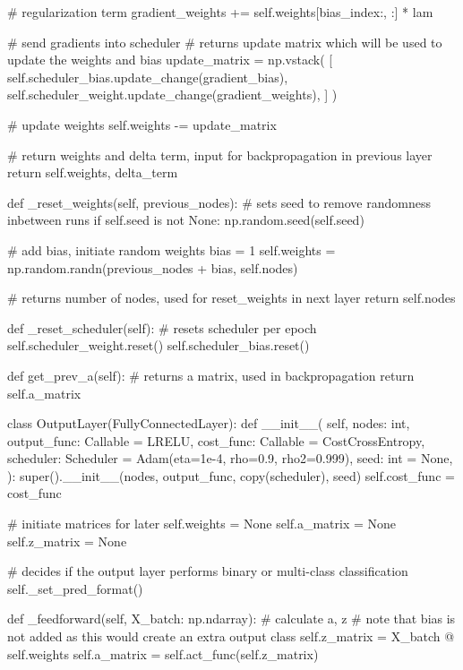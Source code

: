 \documentclass[%
oneside,                 %
final,                   %
10pt]{article}
\begin{document}
        # regularization term
        gradient_weights += self.weights[bias_index:, :] * lam

        # send gradients into scheduler
        # returns update matrix which will be used to update the weights and bias
        update_matrix = np.vstack(
            [
                self.scheduler_bias.update_change(gradient_bias),
                self.scheduler_weight.update_change(gradient_weights),
            ]
        )

        # update weights
        self.weights -= update_matrix

        # return weights and delta term, input for backpropagation in previous layer
        return self.weights, delta_term

    def _reset_weights(self, previous_nodes):
        # sets seed to remove randomness inbetween runs
        if self.seed is not None:
            np.random.seed(self.seed)

        # add bias, initiate random weights
        bias = 1
        self.weights = np.random.randn(previous_nodes + bias, self.nodes)

        # returns number of nodes, used for reset_weights in next layer
        return self.nodes

    def _reset_scheduler(self):
        # resets scheduler per epoch
        self.scheduler_weight.reset()
        self.scheduler_bias.reset()

    def get_prev_a(self):
        # returns a matrix, used in backpropagation
        return self.a_matrix


class OutputLayer(FullyConnectedLayer):
    def __init__(
        self,
        nodes: int,
        output_func: Callable = LRELU,
        cost_func: Callable = CostCrossEntropy,
        scheduler: Scheduler = Adam(eta=1e-4, rho=0.9, rho2=0.999),
        seed: int = None,
    ):
        super().__init__(nodes, output_func, copy(scheduler), seed)
        self.cost_func = cost_func

        # initiate matrices for later
        self.weights = None
        self.a_matrix = None
        self.z_matrix = None

        # decides if the output layer performs binary or multi-class classification
        self._set_pred_format()

    def _feedforward(self, X_batch: np.ndarray):
        # calculate a, z
        # note that bias is not added as this would create an extra output class
        self.z_matrix = X_batch @ self.weights
        self.a_matrix = self.act_func(self.z_matrix)
\end{document}

